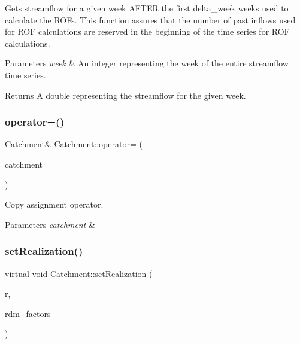 Gets streamflow for a given week A\+F\+T\+ER the first delta\+\_\+week weeks used to calculate the R\+O\+Fs. This function assures that the number of past inflows used for R\+OF calculations are reserved in the beginning of the time series for R\+OF calculations. 


\begin{DoxyParams}{Parameters}
{\em week} & An integer representing the week of the entire streamflow time series. \\
\hline
\end{DoxyParams}
\begin{DoxyReturn}{Returns}
A double representing the streamflow for the given week. 
\end{DoxyReturn}
\mbox{\label{classCatchment_a5abab52eab9c05164f76e46954833989}} 
\subsubsection{\texorpdfstring{operator=()}{operator=()}}
{\footnotesize\ttfamily \mbox{\hyperlink{classCatchment}{Catchment}}\& Catchment\+::operator= (\begin{DoxyParamCaption}\item[{const \mbox{\hyperlink{classCatchment}{Catchment}} \&}]{catchment }\end{DoxyParamCaption})}



Copy assignment operator. 


\begin{DoxyParams}{Parameters}
{\em catchment} & \\
\hline
\end{DoxyParams}
\mbox{\label{classCatchment_ad76654af47dcd69bcb795c1c152409cc}} 
\subsubsection{\texorpdfstring{set\+Realization()}{setRealization()}}
{\footnotesize\ttfamily virtual void Catchment\+::set\+Realization (\begin{DoxyParamCaption}\item[{unsigned long}]{r,  }\item[{vector$<$ double $>$ \&}]{rdm\+\_\+factors }\end{DoxyParamCaption})\hspace{0.3cm}{\ttfamily [virtual]}}



